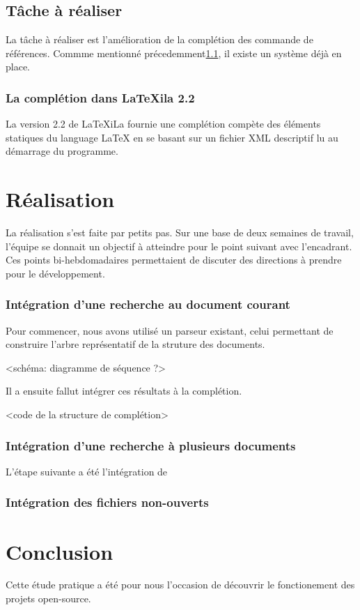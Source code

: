 \documentclass[a4paper,11pt]{report}
\begin{document}
\section{Tâche à réaliser} %
\label{sec:tache_a_realiser}
La tâche à réaliser est l'amélioration de la complétion des commande de références. Commme mentionné précedemment\ref{sub:completion}, il existe un système déjà en place.


\subsection{La complétion dans LaTeXila 2.2}
\label{sub:completion}
La version 2.2 de LaTeXiLa fournie une complétion compète des éléments statiques du language LaTeX en se basant sur un fichier XML descriptif lu au démarrage du programme. 



\chapter{Réalisation}
La réalisation s'est faite par petits pas. Sur une base de deux semaines de travail, l'équipe se donnait un objectif à atteindre pour le point suivant avec l'encadrant.
Ces points bi-hebdomadaires permettaient de discuter des directions à prendre pour le développement.

\subsection{Intégration d'une recherche au document courant}
Pour commencer, nous avons utilisé un parseur existant, celui permettant de construire l'arbre représentatif de la struture des documents.

<schéma: diagramme de séquence ?>

Il a ensuite fallut intégrer ces résultats à la complétion.

<code de la structure de complétion> 

\subsection{Intégration d'une recherche à plusieurs documents}

L'étape suivante a été l'intégration de 

\subsection{Intégration des fichiers non-ouverts}

\chapter{Conclusion}
Cette étude pratique a été pour nous l'occasion de découvrir le fonctionement des projets open-source.
\end{document}
